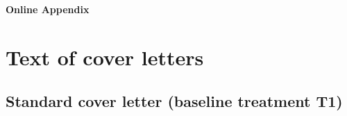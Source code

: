 \documentclass[preprint,inputenc=ansinew,doublespace,notheorems,wider]{jeea}
\begin{document}
\appendix

\begin{center}
\Large{\textbf{Online Appendix}}\\
\end{center}
\normalsize
\section{Text of cover letters}\label{sec:letters}
\renewcommand{\thefigure}{\Alph{section}.\arabic{figure}}
\renewcommand{\thetable}{\Alph{section}.\arabic{table}}
\renewcommand{\thefootnote}{\arabic{footnote}} \setcounter{footnote}{0}

\setcounter{figure}{0}
\setcounter{table}{0}
\setcounter{page}{1}




\subsection{Standard cover letter (baseline treatment T1)}

\end{document}
